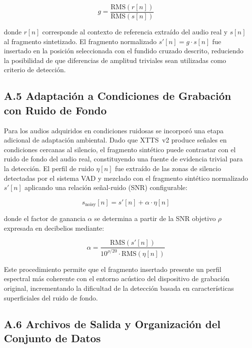 \begin{equation}
    g = \frac{\text{RMS}(r[n])}{\text{RMS}(s[n])}
    \label{eq:rms_gain}
\end{equation}

donde $r[n]$ corresponde al contexto de referencia extraído del audio real y $s[n]$ al
fragmento sintetizado. El fragmento normalizado $s'[n] = g \cdot s[n]$ fue insertado en
la posición seleccionada con el fundido cruzado descrito, reduciendo la posibilidad de
que diferencias de amplitud triviales sean utilizadas como criterio de detección.

\subsection*{A.5 Adaptación a Condiciones de Grabación con Ruido de Fondo}

Para los audios adquiridos en condiciones ruidosas se incorporó una etapa adicional de
adaptación ambiental. Dado que XTTS~v2 produce señales en condiciones cercanas al
silencio, el fragmento sintético puede contrastar con el ruido de fondo del audio real,
constituyendo una fuente de evidencia trivial para la detección. El perfil de ruido
$\eta[n]$ fue extraído de las zonas de silencio detectadas por el sistema VAD y
mezclado con el fragmento sintético normalizado $s'[n]$ aplicando una relación
señal-ruido (SNR) configurable:

\begin{equation}
    s_{\text{noisy}}[n] = s'[n] + \alpha \cdot \eta[n]
    \label{eq:noisy}
\end{equation}

donde el factor de ganancia $\alpha$ se determina a partir de la SNR objetivo $\rho$
expresada en decibelios mediante:

\begin{equation}
    \alpha = \frac{\text{RMS}(s'[n])}{10^{\rho/20} \cdot \text{RMS}(\eta[n])}
    \label{eq:alpha}
\end{equation}

Este procedimiento permite que el fragmento insertado presente un perfil espectral más
coherente con el entorno acústico del dispositivo de grabación original, incrementando
la dificultad de la detección basada en características superficiales del ruido de fondo.

\subsection*{A.6 Archivos de Salida y Organización del Conjunto de Datos}

